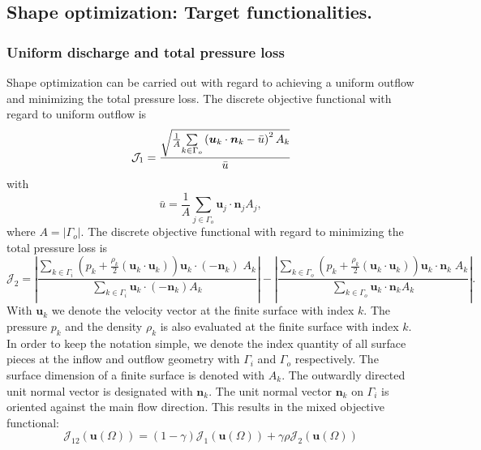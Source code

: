 \documentclass[oneside]{article}
\numberwithin{equation}{section}
\numberwithin{figure}{section}
\newcommand{\Om }{ \Omega}
\newcommand{\bu}{\bar{u}}
\newcommand{\buu}{\boldsymbol{u}}
\newcommand{\bnn}{\boldsymbol{n}}
\newcommand{\JJ }{ \mathcal{J}}
\numberwithin{figure}{section}
\begin{document}
\subsection{Shape optimization: Target functionalities.}

\subsubsection{Uniform discharge and total pressure loss}
Shape optimization can be carried out with regard to achieving a uniform outflow and minimizing the total pressure loss. The discrete objective functional with regard to uniform outflow is
\begin{equation}
\label{J1} \JJ_1= \frac{ \sqrt{ \frac{1}{A}\underset{k \in \Gamma_o}{\sum} \left(\buu_k\cdot \bnn_k - \bu \right)^2 A_k}}{\bu}\\
\end{equation}
with
\begin{equation}
\bu= \frac{1}{A} \underset{j \in \Gamma_o}{\sum} \buu_j \cdot \bnn_j A_j,
\end{equation}
where $A=\left|\Gamma_o\right|$. The discrete objective functional with regard to minimizing the total pressure loss is
\begin{equation}
\JJ_2= \left| \frac{\underset{k \in \Gamma_i}{\sum}\left(p_k+\frac{\rho_k}{2}\left(\buu_k \cdot \buu_k \right)\right) \buu_k \cdot \left(-\bnn_k\right) \; A_k}{\underset{k \in \Gamma_i}{\sum} \buu_k \cdot \left(-\bnn_k\right) A_k}\right|
-\left| \frac{\underset{k \in \Gamma_o}{\sum}\left(p_k+\frac{\rho_k}{2}\left(\buu_k \cdot \buu_k \right)\right) \buu_k \cdot \bnn_k \; A_k}{\underset{k \in \Gamma_o}{\sum} \buu_k \cdot \bnn_k A_k}\right|.
\end{equation}
With $\boldsymbol{u}_k$ we denote the velocity vector at the finite surface with index $k$. The pressure $p_k$ and the density $\rho_k$ is also evaluated at the finite surface with index $k$. In order to keep the notation simple, we denote the index quantity of all surface pieces at the inflow and outflow geometry with $\Gamma_i$ and $\Gamma_o$ respectively. The surface dimension of a finite surface is denoted with $A_k$. The outwardly directed unit normal vector is designated with $\boldsymbol{n}_k$. The unit normal vector $\boldsymbol{n}_k$ on $\Gamma_i$ is oriented against the main flow direction. This results in the mixed objective functional:
\begin{equation}
\label{2.1} \JJ_{12}\left( \buu \left( \Om \right) \right)  = \left(1-\gamma \right)\JJ_1 \left( \buu \left( \Om \right) \right) + \gamma \rho \JJ_2 \left( \buu \left( \Om \right) \right)
\end{equation}
\end{document}
